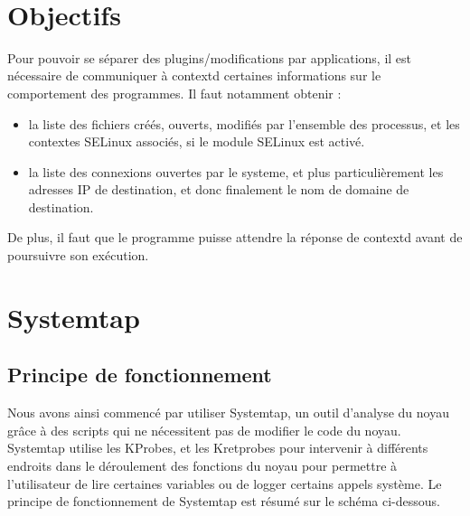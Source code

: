 \documentclass[pdftex,a4paper,titlepage,11pt,openright]{article}
\begin{document}
~

\section*{Objectifs} 

Pour pouvoir se séparer des plugins/modifications par applications, il est nécessaire de communiquer à contextd certaines informations sur le comportement des programmes. Il faut notamment obtenir :
\begin{itemize}
	\item la liste des fichiers créés, ouverts, modifiés par l'ensemble des processus, et les contextes SELinux associés, si le module SELinux est activé.
	\item la liste des connexions ouvertes par le systeme, et plus particulièrement les adresses IP de destination, et donc finalement le nom de domaine de destination.\\
\end{itemize}

De plus, il faut que le programme puisse attendre la réponse de contextd avant de poursuivre son exécution.

\newpage

\section{Systemtap}

\subsection{Principe de fonctionnement}

Nous avons ainsi commencé par utiliser Systemtap, un outil d'analyse du noyau grâce à des scripts qui ne nécessitent pas de modifier le code du noyau. Systemtap utilise les KProbes, et les Kretprobes\cite{IBMRBST} pour intervenir à différents endroits dans le déroulement des fonctions du noyau pour permettre à l'utilisateur de lire certaines variables ou de logger certains appels système. Le principe de fonctionnement de Systemtap est résumé sur le schéma ci-dessous.
\end{document}
